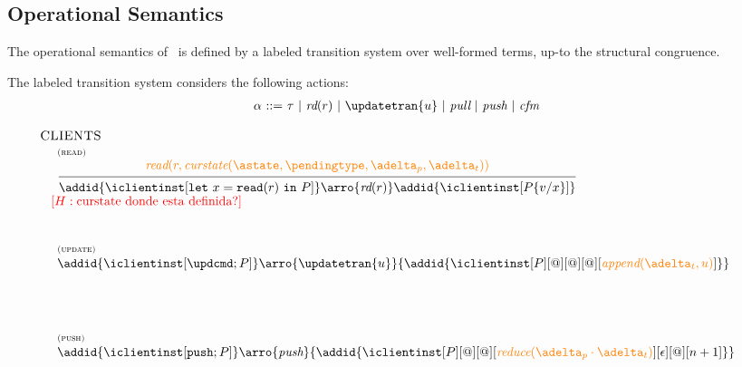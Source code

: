 \documentclass[envcountsect,runningheads,orivec]{llncs}
\begin{document}
\subsection{Operational Semantics}

The operational semantics of \gspcalculus\ is defined by a labeled transition system 
over well-formed terms, up-to the structural congruence.

The labeled transition system considers the following actions:
\[ 
\begin{array}{r@{\ ::= \ }l}
  \alpha & \tau \ | \ \readtran{r} \ | \  \updatetran{u} \ | \ \pulltran \ | \ \pushtran \ | \ \confirmedtran 
  \\
\end{array}
\]



 \[
 \begin{array}{l}
    \hspace{-.3cm} \textsc{CLIENTS}\\
	\mathrule{read}
		{\iread{r}{\curstate{\known}{\pending}{\pushbuffer}{\transactionbuffer}}}
		{\addid{\iclientinst[\treadins{x}{r}]} \arro{\readtran{r}} \addid{\iclientinst[{P}\subst{x}{v}]}}
\\
\henote{\mbox{curstate donde esta definida?}}
\\[25pt]
%		
	\mathax{update}
		{\addid{\iclientinst[\tupdateins]} 
		\arro{\updatetran{u}} 
		{\addid{\iclientinst[P][@][@][@][\iappend{\transactionbuffer}{u}]}}} \\[15pt]
\\[25pt]

	\mathax{push}
	 	{\addid{\iclientinst[\tpushins]} 
		\arro{\pushtran} 
		{\addid{\iclientinst[P][@][@][\ireduce{\pushbuffer\cdot \transactionbuffer}][\epsilon][@][n+1]}}} \\[15pt]



\end{array}\]
\end{document}
